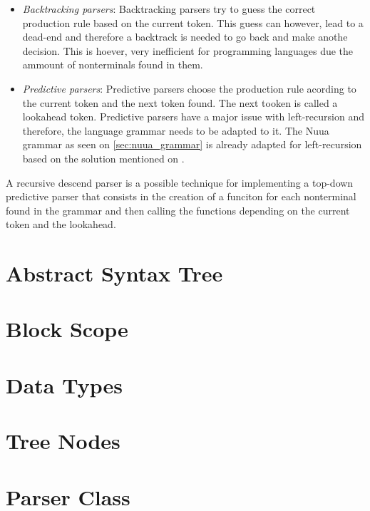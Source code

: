 \begin{itemize}
    \item \emph{Backtracking parsers}: Backtracking parsers try to guess the correct production rule based on the current token. This guess can however, lead to a
        dead-end and therefore a backtrack is needed to go back and make anothe decision. This is hoever, very inefficient for programming languages due the ammount
        of nonterminals found in them.
    \item \emph{Predictive parsers}: Predictive parsers choose the production rule acording to the current token and the next token found. The next tooken is called
        a lookahead token. Predictive parsers have a major issue with left-recursion and therefore, the language grammar needs to be adapted to it.
        The Nuua grammar as seen on \autoref{sec:nuua_grammar} is already adapted for left-recursion based on the solution mentioned on
        \autocite[Section~6]{crafting_interpreters}.
\end{itemize}

A recursive descend parser is a possible technique for implementing a top-down predictive parser that consists in the creation of a funciton for each
nonterminal found in the grammar and then calling the functions depending on the current token and the lookahead.

\section{Abstract Syntax Tree}

\section{Block Scope}

\section{Data Types}

\section{Tree Nodes}

\section{Parser Class}
